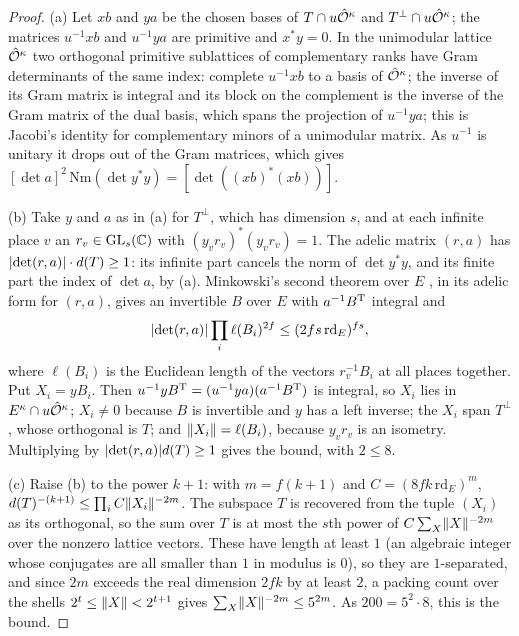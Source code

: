 \begin{proof}
(a) Let $xb$ and $ya$ be the chosen bases of $T\cap u\hat{\mathcal{O}}^\kappa$ and $T^\perp\cap u\hat{\mathcal{O}}^\kappa$; the matrices $u^{-1}xb$ and $u^{-1}ya$ are primitive and $x^*y=0$. In the unimodular lattice $\hat{\mathcal{O}}^\kappa$ two
orthogonal primitive sublattices of complementary ranks have Gram determinants of the same index: complete $u^{-1}xb$ to a basis of $\hat{\mathcal{O}}^\kappa$; the inverse of its Gram matrix is integral and its block on the
complement is the inverse of the Gram matrix of the dual basis, which spans the projection of $u^{-1}ya$; this is Jacobi's identity for complementary minors of a unimodular matrix. As $u^{-1}$ is unitary it drops
out of the Gram matrices, which gives $[\det a]^2\,\mathrm{Nm}(\det y^*y)=[\det((xb)^*(xb))]$.

(b) Take $y$ and $a$ as in (a) for $T^\perp$, which has dimension $s$, and at each infinite place $v$ an $r_v\in\operatorname{GL}_s(\mathbb{C})$ with $(y_vr_v)^*(y_vr_v)=1$. The adelic matrix $(r,a)$ has
$\lvert \det(r,a)\rvert\cdot d(T)\ge1$: its infinite part cancels the norm of $\det y^*y$, and its finite part the index of $\det a$, by (a). Minkowski's second theorem over $E$ \cite{BombieriVaaler1983}, in its adelic
form for $(r,a)$, gives an invertible $B$ over $E$ with $a^{-1}B^{\rm T}$ integral and
\[
  \lvert \det(r,a)\rvert\prod_i\ell(B_i)^{2f}\le(2fs\,\mathrm{rd}_E)^{fs},
\]
where $\ell(B_i)$ is the Euclidean length of the vectors $r_v^{-1}B_i$ at all places together. Put $X_i=yB_i$. Then $u^{-1}yB^{\rm T}=(u^{-1}ya)(a^{-1}B^{\rm T})$ is integral, so $X_i$ lies in $E^\kappa\cap u\hat{\mathcal{O}}^\kappa$; $X_i\ne0$
because $B$ is invertible and $y$ has a left inverse; the $X_i$ span $T^\perp$, whose orthogonal is $T$; and $\lVert X_i\rVert=\ell(B_i)$, because $y_vr_v$ is an isometry. Multiplying by $\lvert \det(r,a)\rvert d(T)\ge1$ gives the bound,
with $2\le8$.

(c) Raise (b) to the power $k+1$: with $m=f(k+1)$ and $C=(8fk\,\mathrm{rd}_E)^m$, $d(T)^{-(k+1)}\le\prod_i C\lVert X_i\rVert^{-2m}$. The subspace $T$ is recovered from the tuple $(X_i)$ as its orthogonal, so the sum over
$T$ is at most the $s$th power of $C\sum_X\lVert X\rVert^{-2m}$ over the nonzero lattice vectors. These have length at least $1$ (an algebraic integer whose conjugates are all smaller than $1$ in modulus is $0$), so
they are $1$-separated, and since $2m$ exceeds the real dimension $2fk$ by at least $2$, a packing count over the shells $2^t\le\lVert X\rVert<2^{t+1}$ gives $\sum_X\lVert X\rVert^{-2m}\le5^{2m}$. As $200=5^2\cdot8$, this is the bound.
\end{proof}

